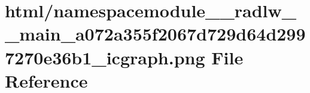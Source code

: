 \hypertarget{namespacemodule____radlw____main__a072a355f2067d729d64d2997270e36b1__icgraph_8png}{}\section{html/namespacemodule\+\_\+\+\_\+radlw\+\_\+\+\_\+main\+\_\+a072a355f2067d729d64d2997270e36b1\+\_\+icgraph.png File Reference}
\label{namespacemodule____radlw____main__a072a355f2067d729d64d2997270e36b1__icgraph_8png}
